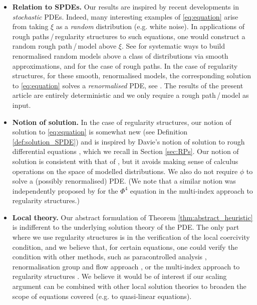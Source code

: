 \documentclass[11pt,a4paper]{article}
\numberwithin{equation}{section}
\theoremstyle{definition}
\theoremstyle{remark}
\begin{document}
\begin{itemize}
\item \textbf{Relation to SPDEs.} Our results are inspired by recent developments in \emph{stochastic} PDEs.
Indeed, many interesting examples of \eqref{eq:equation} arise from taking $\xi$ as a \emph{random} distribution (e.g. white noise).
In applications of rough paths\,/\,regularity structures to such equations, one would construct a random rough path\,/\,model above $\xi$.
See \cite{CH16,LOTT24,HS23_BPHZ} for systematic ways to build renormalised random models above a class of distributions via smooth approximations, and \cite{FV10,FrizHairer20} for the case of rough paths.
In the case of regularity structures, for these smooth, renormalised models, the corresponding solution to \eqref{eq:equation} solves a \emph{renormalised} PDE,
see \cite{BCCH21}.
The results of the present article are entirely deterministic and we only require a rough path\,/\,model as input.

  \item \textbf{Notion of solution.}
  In the case of regularity structures, our notion of solution to \eqref{eq:equation} is somewhat new (see Definition \ref{def:solution_SPDE})
  and is inspired by Davie's notion of solution to rough differential equations \cite{Davie_08}, which we recall in Section \ref{sec:RPs}.
  Our notion of solution is consistent with that of \cite{Hairer14}, but it avoids making sense of calculus operations on the space of modelled distributions.
  We also do not require $\phi$ to solve a (possibly renormalised) PDE.
  (We note that a similar notion was independently proposed by \cite{BOS_25_Phi4} for the $\Phi^4$ equation in the multi-index approach to regularity structures.)

  \item \textbf{Local theory.}
  Our abstract formulation of Theorem \ref{thm:abstract_heuristic} is indifferent to the underlying solution theory of the PDE.
  The only part where we use regularity structures is in the verification of the local coercivity condition,
  and we believe that, for certain equations,
  one could verify the condition with other methods, such as paracontrolled analysis \cite{GIP15}, renormalisation group and flow approach \cite{Kupiainen2016,Duch25_flow},
  or the multi-index approach to regularity structures \cite{OW19,LOT23,OSSW25_a_priori}.
  We believe it would be of interest if our scaling argument can be combined with other local solution theories to broaden the scope of equations covered (e.g. to quasi-linear equations).


\end{itemize}
\end{document}
